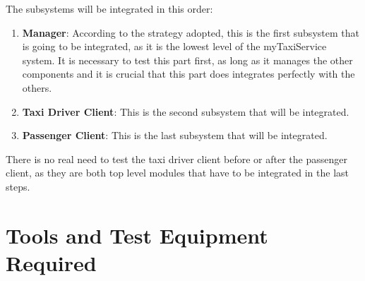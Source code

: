 \documentclass[18pt,oneside,a4paper, titlepage]{article}
\begin{document}
			The subsystems will be integrated in this order:
			\begin{enumerate}
				\item \textbf{Manager}: According to the strategy adopted, this is the first subsystem that is going to be integrated, as it is the lowest level of the myTaxiService system. It is necessary to test this part first, as long as it manages the other components and it is crucial that this part does integrates perfectly with the others.
				\item \textbf{Taxi Driver Client}: This is the second subsystem that will be integrated.
				\item \textbf{Passenger Client}: This is the last subsystem that will be integrated.
			\end{enumerate}
			There is no real need to test the taxi driver client before or after the passenger client, as they are both top level modules that have to be integrated in the last steps. 
		

\newpage



\newpage
\section{Tools	and	Test	Equipment	Required}
\end{document}
